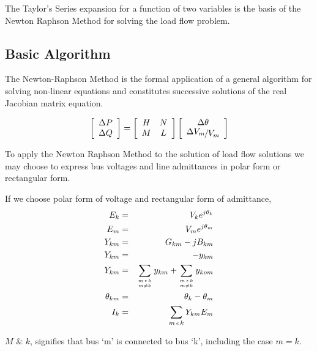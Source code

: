 \documentclass[a4paper,11pt]{article}
\begin{document}
The Taylor's Series expansion for a function of two variables is the basis of the Newton Raphson Method for solving the load flow problem.

\subsection{Basic Algorithm}

The Newton-Raphson Method is the formal application of a general algorithm for solving non-linear equations and constitutes successive solutions of the real Jacobian matrix equation.

\begin{equation} \label{eq:nr}
\left[ \begin{array}{c} 
\Delta P \\
\Delta Q \end{array} \right]
=
\left[ \begin{array}{cc} 
H & N \\
M & L \end{array} \right]
\left[ \begin{array}{c} 
\Delta \theta \\
\nicefrac{\displaystyle{\Delta V_{m}}}{\displaystyle{V_{m}}} \end{array} \right]
\end{equation}

To apply the Newton Raphson Method to the solution of load flow solutions we may choose to express bus voltages and line admittances in polar form or rectangular form.

If we choose polar form of voltage and rectangular form of admittance,
\begin{eqnarray}
E_{k} & = & V_{k}e^{j\theta_{k}} \nonumber \\
E_{m} & = & V_{m}e^{j\theta_{m}} \nonumber \\ 
Y_{km} & = & G_{km} - jB_{km} \nonumber \\
Y_{km} & = & -y_{km} \\
Y_{km} & = & \sum_{m\,\epsilon\,k \atop m \neq k} y_{km} + \sum_{m\, \epsilon\, k \atop m \neq k} y_{kom} \nonumber \\
\theta_{km} & = & \theta_{k} - \theta_{m} \nonumber \\
I_{k} & = & \sum_{m\, \epsilon\, k} Y_{km}E_{m} \nonumber
\end{eqnarray}

$M$ \& $k$, signifies that bus `m' is connected to bus `k', including the case $m=k$.
\end{document}
